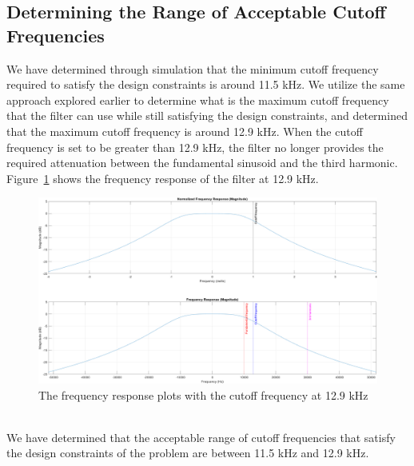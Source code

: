 \documentclass[12pt]{article}
\begin{document}
\subsection*{Determining the Range of Acceptable Cutoff Frequencies}
We have determined through simulation that the minimum cutoff frequency required to satisfy the design constraints is around 11.5 kHz. We utilize the same approach explored earlier to determine what is the maximum cutoff frequency that the filter can use while still satisfying the design constraints, and determined that the maximum cutoff frequency is around 12.9 kHz. When the cutoff frequency is set to be greater than 12.9 kHz, the filter no longer provides the required attenuation between the fundamental sinusoid and the third harmonic. Figure~\ref{fig:max_freq_response} shows the frequency response of the filter at 12.9 kHz.
\begin{figure}[h!]
    \includegraphics[width=\textwidth]{max_frequency_response.png}
    \caption{\label{fig:max_freq_response} The frequency response plots with the cutoff frequency at 12.9 kHz}
\end{figure} \\

We have determined that the acceptable range of cutoff frequencies that satisfy the design constraints of the problem are between 11.5 kHz and 12.9 kHz.
\end{document}
